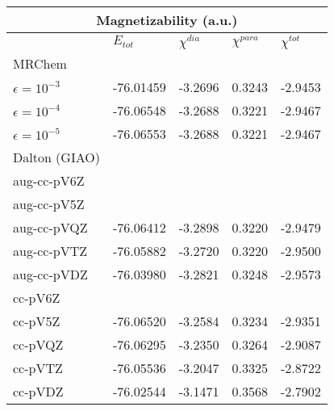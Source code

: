 \begin{frame}
\begin{table}
\tiny
\centering
\begin{tabular}{l|l|lll}
\multicolumn{5}{c}{\textbf{Magnetizability (a.u.)}}\\
\hline
\hline
                    &$E_{tot}$&$\chi^{dia}$ &$\chi^{para}$&$\chi^{tot}$\\
\hline
MRChem              &         &             &             &            \\
$\epsilon=10^{-3}$  &-76.01459& -3.2696     & 0.3243      & -2.9453    \\
$\epsilon=10^{-4}$  &-76.06548& -3.2688     & 0.3221      & -2.9467    \\
$\epsilon=10^{-5}$  &-76.06553& -3.2688     & 0.3221      & -2.9467    \\
\hline
Dalton (GIAO)       &         &             &             &            \\
aug-cc-pV6Z         &         &             &             &            \\
aug-cc-pV5Z         &         &             &             &            \\
aug-cc-pVQZ         &-76.06412& -3.2898     & 0.3220      & -2.9479    \\
aug-cc-pVTZ         &-76.05882& -3.2720     & 0.3220      & -2.9500    \\
aug-cc-pVDZ         &-76.03980& -3.2821     & 0.3248      & -2.9573    \\
cc-pV6Z	            &         &             &             &            \\
cc-pV5Z	            &-76.06520& -3.2584     & 0.3234      & -2.9351    \\
cc-pVQZ	            &-76.06295& -3.2350     & 0.3264      & -2.9087    \\
cc-pVTZ	            &-76.05536& -3.2047     & 0.3325      & -2.8722    \\
cc-pVDZ	            &-76.02544& -3.1471     & 0.3568      & -2.7902    \\
\hline
\hline
\end{tabular}
\end{table}

\end{frame}


